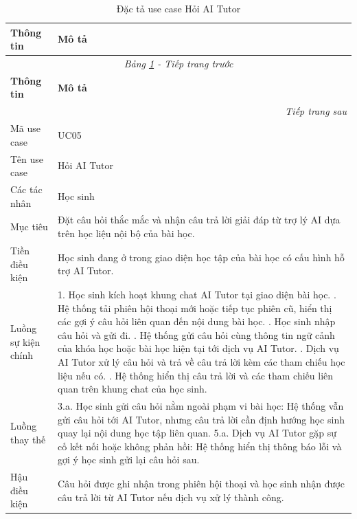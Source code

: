 ﻿\documentclass[../DoAn.tex]{subfiles}
\begin{document}
\begin{longtable}{|p{3.5cm}|p{10.5cm}|}
\caption{Đặc tả use case Hỏi AI Tutor}
\label{table:uc05_hoi_ai_tutor} \\
\hline
\textbf{Thông tin} & \textbf{Mô tả} \\ \hline
\endfirsthead

\hline
\multicolumn{2}{|c|}{\textit{Bảng \ref{table:uc05_hoi_ai_tutor} - Tiếp trang trước}} \\ \hline
\textbf{Thông tin} & \textbf{Mô tả} \\ \hline
\endhead

\hline
\multicolumn{2}{|r|}{\textit{Tiếp trang sau}} \\ \hline
\endfoot

\hline
\endlastfoot

Mã use case & UC05 \\ \hline
Tên use case & Hỏi AI Tutor \\ \hline
Các tác nhân & Học sinh \\ \hline
Mục tiêu & Đặt câu hỏi thắc mắc và nhận câu trả lời giải đáp từ trợ lý AI dựa trên học liệu nội bộ của bài học. \\ \hline
Tiền điều kiện & Học sinh đang ở trong giao diện học tập của bài học có cấu hình hỗ trợ AI Tutor. \\ \hline
Luồng sự kiện chính & 
1. Học sinh kích hoạt khung chat AI Tutor tại giao diện bài học. \newline
2. Hệ thống tải phiên hội thoại mới hoặc tiếp tục phiên cũ, hiển thị các gợi ý câu hỏi liên quan đến nội dung bài học. \newline
3. Học sinh nhập câu hỏi và gửi đi. \newline
4. Hệ thống gửi câu hỏi cùng thông tin ngữ cảnh của khóa học hoặc bài học hiện tại tới dịch vụ AI Tutor. \newline
5. Dịch vụ AI Tutor xử lý câu hỏi và trả về câu trả lời kèm các tham chiếu học liệu nếu có. \newline
6. Hệ thống hiển thị câu trả lời và các tham chiếu liên quan trên khung chat của học sinh. \\ \hline
Luồng thay thế & 
3.a. Học sinh gửi câu hỏi nằm ngoài phạm vi bài học: Hệ thống vẫn gửi câu hỏi tới AI Tutor, nhưng câu trả lời cần định hướng học sinh quay lại nội dung học tập liên quan. \newline
5.a. Dịch vụ AI Tutor gặp sự cố kết nối hoặc không phản hồi: Hệ thống hiển thị thông báo lỗi và gợi ý học sinh gửi lại câu hỏi sau. \\ \hline
Hậu điều kiện & Câu hỏi được ghi nhận trong phiên hội thoại và học sinh nhận được câu trả lời từ AI Tutor nếu dịch vụ xử lý thành công. \\ \hline
\end{longtable}
\endgroup
\end{document}
